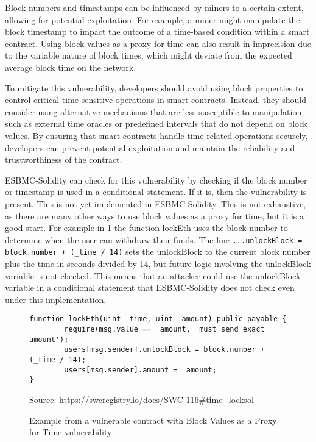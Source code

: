 Block numbers and timestamps can be influenced by miners to a certain extent, allowing for potential exploitation. For example, a miner might manipulate the block timestamp to impact the outcome of a time-based condition within a smart contract. Using block values as a proxy for time can also result in imprecision due to the variable nature of block times, which might deviate from the expected average block time on the network.

To mitigate this vulnerability, developers should avoid using block properties to control critical time-sensitive operations in smart contracts. Instead, they should consider using alternative mechanisms that are less susceptible to manipulation, such as external time oracles or predefined intervals that do not depend on block values. By ensuring that smart contracts handle time-related operations securely, developers can prevent potential exploitation and maintain the reliability and trustworthiness of the contract.

ESBMC-Solidity can check for this vulnerability by checking if the block number or timestamp is used in a conditional statement. If it is, then the vulnerability is present. This is not yet implemented in ESBMC-Solidity. This is not exhaustive, as there are many other ways to use block values as a proxy for time, but it is a good start. For example in \ref{fig:block_values_as_a_proxy_for_time} the function lockEth uses the block number to determine when the user can withdraw their funds. The line \verb|...unlockBlock = block.number + (_time / 14)| sets the unlockBlock to the current block number plus the time in seconds divided by 14, but future logic involving the unlockBlock variable is not checked. This means that an attacker could use the unlockBlock variable in a conditional statement that ESBMC-Solidity does not check even under this implementation.

\begin{figure}
\begin{lstlisting}
function lockEth(uint _time, uint _amount) public payable {
        require(msg.value == _amount, 'must send exact amount');
        users[msg.sender].unlockBlock = block.number + (_time / 14);
        users[msg.sender].amount = _amount;
}
\end{lstlisting}
\caption{Example from a vulnerable contract with Block Values as a Proxy for Time vulnerability}
Source: \url{https://swcregistry.io/docs/SWC-116#time_locksol} \cite{timelock}
\label{fig:block_values_as_a_proxy_for_time}
\end{figure}

